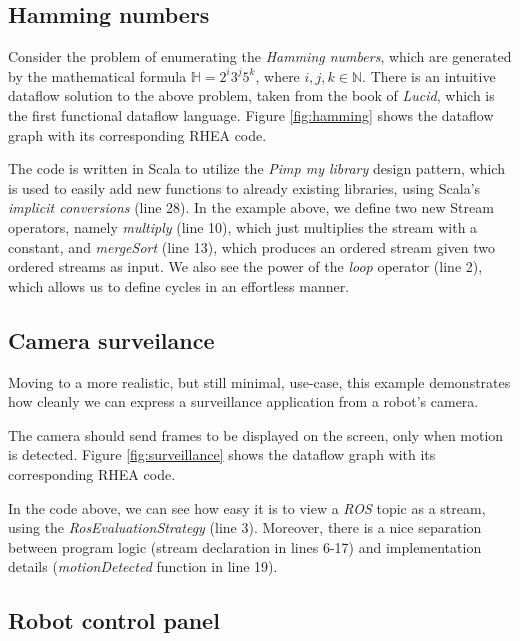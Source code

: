\documentclass[sigplan,review,anonymous]{acmart}\settopmatter{printfolios=true,printacmref=false}
\begin{document}
\subsection{Hamming numbers}
Consider the problem of enumerating the \textit{Hamming numbers}, which are generated by the mathematical formula $\mathbb{H} = 2^i3^j5^k$, where $i,j,k \in \mathbb{N}$. There is an intuitive dataflow solution to the above problem, taken from the book of \textit{Lucid}, which is the first functional dataflow language\cite{lucid}. Figure \ref{fig:hamming} shows the dataflow graph with its corresponding \textsc{RHEA} code.


The code is written in Scala to utilize the \textit{Pimp my library} design pattern\cite{pimp}, which is used to easily add new functions to already existing libraries, using Scala's \textit{implicit conversions} (line 28). In the example above, we define two new Stream operators, namely \textit{multiply} (line 10), which just multiplies the stream with a constant, and \textit{mergeSort} (line 13), which produces an ordered stream given two ordered streams as input. We also see the power of the \textit{loop} operator (line 2), which allows us to define cycles in an effortless manner.

\subsection{Camera surveilance}

Moving to a more realistic, but still minimal, use-case, this example demonstrates how cleanly we can express a surveillance application from a robot's camera.

The camera should send frames to be displayed on the screen, only when motion is detected. Figure \ref{fig:surveillance} shows the dataflow graph with its corresponding \textsc{RHEA} code.


In the code above, we can see how easy it is to view a \textit{ROS} topic as a stream, using the \textit{RosEvaluationStrategy} (line 3). Moreover, there is a nice separation between program logic (stream declaration in lines 6-17) and implementation details (\textit{motionDetected} function in line 19).

\subsection{Robot control panel}
\end{document}
